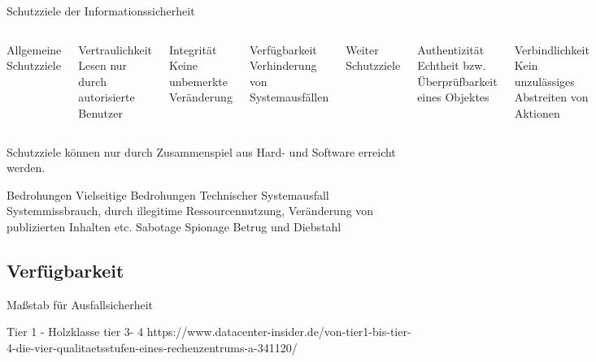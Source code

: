 \documentclass[10pt]{beamer}
\begin{document}
\begin{frame}[fragile]{Schutzziele der Informationssicherheit}
\begin{columns}[T,onlytextwidth]
	Allgemeine Schutzziele
	\begin{exampleblock}{Vertraulichkeit}
		Lesen nur durch autorisierte Benutzer
	\end{exampleblock}
	
	\begin{exampleblock}{Integrität}
		Keine unbemerkte Veränderung
	\end{exampleblock}
	
	\begin{exampleblock}{Verfügbarkeit}
		Verhinderung von Systemausfällen
	\end{exampleblock}
	
	Weiter Schutzziele
	\begin{exampleblock}{Authentizität}
		Echtheit bzw. Überprüfbarkeit eines Objektes
	\end{exampleblock}
	
	\begin{exampleblock}{Verbindlichkeit}
		Kein unzulässiges Abstreiten von Aktionen
	\end{exampleblock}
	
	\begin{exampleblock}{Zurechenbarkeit}
		Zuordnung einer Aktion auf Benutzer
	\end{exampleblock}
	
\end{columns}

Schutzziele können nur durch Zusammenspiel aus Hard- und Software erreicht werden.
\end{frame}

\begin{frame}[fragile]{Bedrohungen}
Vielseitige Bedrohungen
Technischer Systemausfall
Systemmissbrauch, durch illegitime Ressourcennutzung, Veränderung von publizierten Inhalten etc.
Sabotage
Spionage
Betrug und Diebstahl
\end{frame}

\subsection{Verfügbarkeit}

\begin{frame}[fragile]{Maßstab für Ausfallsicherheit}
	\begin{alertblock}{Tier 1 - Holzklasse}
tier 3- 4
	https://www.datacenter-insider.de/von-tier1-bis-tier-4-die-vier-qualitaetsstufen-eines-rechenzentrums-a-341120/
\end{alertblock}
\end{frame}
\end{document}

